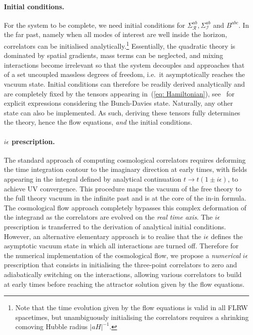 \documentclass[11pt]{article}
\numberwithin{equation}{section} %
\def \Re {\mathcal{R}}
\def \Im {\mathcal{I}}
\begin{document}
\paragraph{Initial conditions.} For the system to be complete, we need initial conditions for $\Sigma_{\Re}^{ab}, \Sigma_{\Im}^{ab}$ and $B^{abc}$. In the far past, namely when all modes of interest are well inside the horizon, correlators can be initialised analytically.\footnote{Note that the time evolution given by the flow equations is valid in all FLRW spacetimes, but unambiguously initialising the correlators requires a shrinking comoving Hubble radius $|a H|^{-1}$.} Essentially, the quadratic theory is dominated by spatial gradients, mass terms can be neglected, and mixing interactions become irrelevant so that the system decouples and approaches that of a set uncoupled massless degrees of freedom, i.e.~it asymptotically reaches the vacuum state. Initial conditions can therefore be readily derived analytically and are completely fixed by the tensors appearing in~(\ref{eq: Hamiltonian}), see~\cite{Pinol:2023oux} for explicit expressions considering the Bunch-Davies state. Naturally, any other state can also be implemented. As such, deriving these tensors fully determines the theory, hence the flow equations, \textit{and} the initial conditions. 

\paragraph{$i\epsilon$ prescription.} The standard approach of computing cosmological correlators requires deforming the time integration contour to the imaginary direction at early times, with fields appearing in the integral defined by analytical continuation $t \rightarrow t(1\pm i\epsilon)$, to achieve UV convergence. This procedure maps the vacuum of the free theory to the full theory vacuum in the infinite past and is at the core of the in-in formula. The cosmological flow approach completely bypasses this complex deformation of the integrand as the correlators are evolved on the \textit{real time axis}. The $i\epsilon$ prescription is transferred to the derivation of analytical initial conditions. However, an alternative elementary approach is to realise that the $i\epsilon$ defines the asymptotic vacuum state in which all interactions are turned off. Therefore for the numerical implementation of the cosmological flow, we propose a \textit{numerical} $i\epsilon$ prescription that consists in initialising the three-point correlators to zero and adiabatically switching on the interactions, allowing various correlators to build at early times before reaching the attractor solution given by the flow equations.
\end{document}
